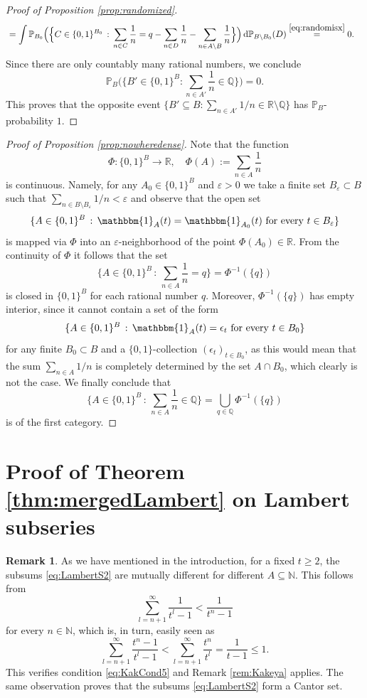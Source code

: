 \documentclass[11pt,letterpaper,reqno]{amsart}
\numberwithin{equation}{section}
\theoremstyle{definition}
\newtheorem{remark}[theorem]{Remark}
\numberwithin{equation}{section}
\begin{document}
\begin{proof}[Proof of Proposition \ref{prop:randomized}]
\begin{align*}
& = \int \mathbb{P}_{B_0}\Big(\Big\{C\in\{0,1\}^{B_0} \,:\, \sum_{n\in C}\frac{1}{n} = q - \sum_{n\in D}\frac{1}{n} - \sum_{n\in A\setminus B}\frac{1}{n}\Big\}\Big) \,\textup{d}\mathbb{P}_{B\setminus B_0}(D) \stackrel{\eqref{eq:randomisx}}{=} 0.
\end{align*}
Since there are only countably many rational numbers, we conclude
\[ \mathbb{P}_B\Big(\Big\{B'\in\{0,1\}^B : \sum_{n\in A'}\frac{1}{n}\in\mathbb{Q}\Big\}\Big) = 0. \]
This proves that the opposite event $\{B'\subseteq B : \sum_{n\in A'}1/n \in \mathbb{R}\setminus\mathbb{Q}\}$ has $\mathbb{P}_B$-probability $1$.
\end{proof}

\begin{proof}[Proof of Proposition \ref{prop:nowheredense}]
Note that the function
\[ \Phi\colon\{0,1\}^B \to \mathbb{R}, \quad \Phi(A) := \sum_{n\in A} \frac{1}{n} \]
is continuous.
Namely, for any $A_0\in \{0,1\}^B$ and $\varepsilon>0$ we take a finite set $B_\varepsilon\subset B$ such that $\sum_{n\in B\setminus B_\varepsilon}1/n<\varepsilon$ and observe that the open set
\[ \{A\in\{0,1\}^B \,:\, \mathbbm{1}_A(t)=\mathbbm{1}_{A_0}(t) \text{ for every } t\in B_\varepsilon \} \]
is mapped via $\Phi$ into an $\varepsilon$-neighborhood of the point $\Phi(A_0)\in\mathbb{R}$.
From the continuity of $\Phi$ it follows that the set
\[ \Big\{ A\in\{0,1\}^B \,:\, \sum_{n\in A} \frac{1}{n} = q \Big\} = \Phi^{-1}(\{q\}) \]
is closed in $\{0,1\}^B$ for each rational number $q$. Moreover, $\Phi^{-1}(\{q\})$ has empty interior, since it cannot contain a set of the form
\[ \{A\in\{0,1\}^B \,:\, \mathbbm{1}_A(t)=\epsilon_t \text{ for every } t\in B_0 \} \]
for any finite $B_0\subset B$ and a $\{0,1\}$-collection $(\epsilon_t)_{t\in B_0}$, as this would mean that the sum $\sum_{n\in A}1/n$ is completely determined by the set $A\cap B_0$, which clearly is not the case.
We finally conclude that
\[ \Big\{ A\in\{0,1\}^B \,:\, \sum_{n\in A} \frac{1}{n} \in \mathbb{Q} \Big\} = \bigcup_{q\in\mathbb{Q}} \Phi^{-1}(\{q\}) \]
is of the first category.
\end{proof}


\section{Proof of Theorem \ref{thm:mergedLambert} on Lambert subseries}
\label{sec:Lambert}

\begin{remark}\label{rem:LambertCantor}
As we have mentioned in the introduction, for a fixed $t\geqslant2$, the subsums \eqref{eq:LambertS2} are mutually different for different $A\subseteq\mathbb{N}$.
This follows from
\[ \sum_{l=n+1}^{\infty} \frac{1}{t^l-1} < \frac{1}{t^n-1} \]
for every $n\in\mathbb{N}$, which is, in turn, easily seen as
\[ \sum_{l=n+1}^{\infty} \frac{t^n-1}{t^l-1} < \sum_{l=n+1}^{\infty} \frac{t^n}{t^l} = \frac{1}{t-1} \leqslant 1. \]
This verifies condition \eqref{eq:KakCond5} and Remark \ref{rem:Kakeya} applies. The same observation proves that the subsums \eqref{eq:LambertS2} form a Cantor set.
\end{remark}
\end{document}
